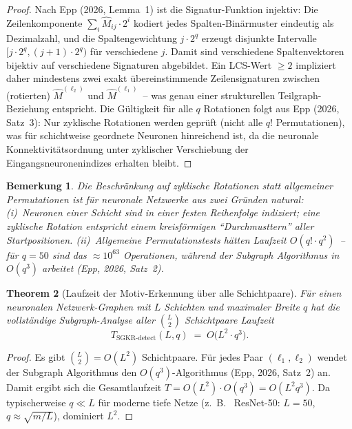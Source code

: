 \documentclass[12pt, a4paper, openany]{report}
\newtheorem{theorem}{Theorem}[chapter]
\newtheorem{remark}[theorem]{Bemerkung}
\begin{document}
\begin{proof}
Nach Epp (2026, Lemma~1) ist die Signatur-Funktion injektiv: Die
Zeilenkomponente $\sum_{i} \hat{M}_{ij} \cdot 2^i$ kodiert jedes
Spalten-Binärmuster eindeutig als Dezimalzahl, und die Spaltengewichtung
$j \cdot 2^q$ erzeugt disjunkte Intervalle $[j\cdot 2^q, (j+1)\cdot 2^q)$
für verschiedene $j$.  Damit sind verschiedene Spalten\-vektoren
bijektiv auf verschiedene Signaturen abgebildet.  Ein
LCS-Wert $\geq 2$ impliziert daher mindestens zwei exakt übereinstimmende
Zeilen\-signaturen zwischen (rotierten) $\hat{M}^{(\ell_2)}$ und
$\hat{M}^{(\ell_1)}$~-- was genau einer strukturellen Teilgraph-Beziehung
entspricht.  Die Gültigkeit für alle $q$ Rotationen folgt aus Epp (2026,
Satz~3): Nur zyklische Rotationen werden geprüft (nicht alle $q!$
Permutationen), was für schichtweise geordnete Neuronen hinreichend ist,
da die neuronale Konnektivitätsordnung unter zyklischer Verschiebung
der Ein\-gangs\-neuronen\-indizes erhalten bleibt.
\end{proof}

\begin{remark}
Die Beschränkung auf zyklische Rotationen statt allgemeiner Permutationen
ist für neuronale Netzwerke aus zwei Gründen natural: (i)~Neuronen
einer Schicht sind in einer festen Reihenfolge indiziert; eine zyklische
Rotation entspricht einem kreisförmigen ``Durchmusttern'' aller
Startpositionen.  (ii)~Allgemeine Permutationstests hätten Laufzeit
$O(q! \cdot q^2)$~-- für $q = 50$ sind das $\approx 10^{63}$ Operationen,
während der Subgraph Algorithmus in $O(q^3)$ arbeitet
(Epp, 2026, Satz~2).
\end{remark}

\begin{theorem}[Laufzeit der Motiv-Erkennung über alle Schichtpaare]
\label{thm:motif_runtime}
Für einen neuronalen Netzwerk-Graphen mit $L$ Schichten und maximaler
Breite $q$ hat die vollständige Subgraph-Analyse aller $\binom{L}{2}$
Schicht\-paare Laufzeit
\begin{equation}
  \label{eq:motif_runtime}
  T_{\mathrm{SGKR\text{-}detect}}(L, q)
  \;=\; O\!\bigl(L^2 \cdot q^3\bigr).
\end{equation}
\end{theorem}

\begin{proof}
Es gibt $\binom{L}{2} = O(L^2)$ Schichtpaare.  Für jedes Paar
$(\ell_1, \ell_2)$ wendet der Subgraph Algorithmus den
$O(q^3)$-Algorithmus (Epp, 2026, Satz~2) an.  Damit ergibt sich die
Gesamtlaufzeit $T = O(L^2) \cdot O(q^3) = O(L^2 q^3)$.  Da
typischerweise $q \ll L$ für moderne tiefe Netze (z.~B.~ ResNet-50:
$L = 50$, $q \approx \sqrt{m/L}$), dominiert $L^2$.
\end{proof}
\end{document}
